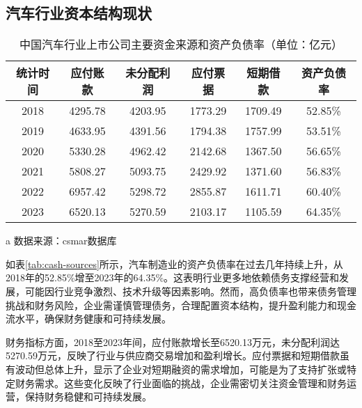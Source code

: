 \subsection{汽车行业资本结构现状}
\begin{table}
  \centering
  \begin{threeparttable}[c]
    \caption{中国汽车行业上市公司主要资金来源和资产负债率（单位：亿元）}
    \label{tab:cash-sources}
    \begin{tabular}{cccccc}
      \toprule
        统计时间 & 应付账款 & 未分配利润 & 应付票据 & 短期借款 & 资产负债率 \\ 
      \midrule
        2018 & 4295.78  & 4203.95  & 1773.29  & 1709.49  & 52.85\% \\ 
        2019 & 4633.95  & 4391.56  & 1794.38  & 1757.99  & 53.51\% \\ 
        2020 & 5330.28  & 4962.42  & 2142.68  & 1367.50  & 56.65\% \\ 
        2021 & 5808.27  & 5093.75  & 2429.92  & 1371.60  & 56.83\% \\ 
        2022 & 6957.42  & 5298.72  & 2855.87  & 1611.71  & 60.40\% \\ 
        2023 & 6520.13  & 5270.59  & 2103.17  & 1105.59  & 64.35\% \\ 
      \bottomrule
    \end{tabular}
    \begin{tablenotes}
      \item [a] 数据来源：csmar数据库
    \end{tablenotes}
  \end{threeparttable}
\end{table}
如表\eqref{tab:cash-sources}所示，汽车制造业的资产负债率在过去几年持续上升，从2018年的52.85\%增至2023年的64.35\%。这表明行业更多地依赖债务支撑经营和发展，可能因行业竞争激烈、技术升级等因素影响。然而，高负债率也带来债务管理挑战和财务风险，企业需谨慎管理债务，合理配置资本结构，提升盈利能力和现金流水平，确保财务健康和可持续发展。

财务指标方面，2018至2023年间，应付账款增长至6520.13万元，未分配利润达5270.59万元，反映了行业与供应商交易增加和盈利增长。应付票据和短期借款虽有波动但总体上升，显示了企业对短期融资的需求增加，可能是为了支持扩张或特定财务需求。这些变化反映了行业面临的挑战，企业需密切关注资金管理和财务运营，保持财务稳健和可持续发展。

